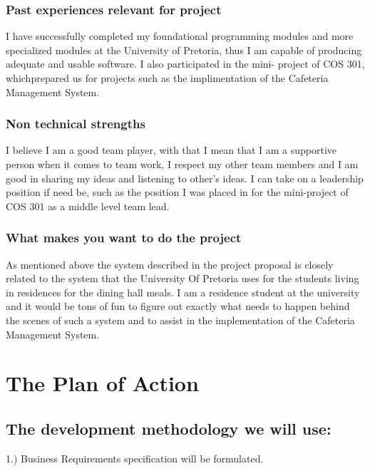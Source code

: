 \documentclass[hidelinks, 12pt, oneside]{article}
\begin{document}
\subsubsection{Past experiences relevant for project}
I have successfully completed my foundational programming modules and
more specialized modules at the University of Pretoria, thus I am capable
of producing adequate and usable software. I also participated in the mini-
project of COS 301, whichprepared us for projects such as the implimentation of 
the Cafeteria Management System. 

\subsubsection{Non technical strengths}
I believe I am a good team player, with that I mean that I am a supportive
person when it comes to team work, I respect my other team members and
I am good in sharing my ideas and listening to other's ideas. I can take on
a leadership position if need be, such as the position I was placed in for the
mini-project of COS 301 as a middle level team lead.

\subsubsection{What makes you want to do the project}
As  mentioned above the system described in the project proposal is closely related to the system that the University Of Pretoria uses for the students living in residences for the dining hall meals. I am a residence student at the university and it would be tons of fun to figure out exactly what needs to happen behind the scenes of such a system and to assist in the implementation of the Cafeteria Management System. 

\section{The Plan of Action}

\subsection{The development methodology we will use:}

1.) Business Requirements specification will be formulated.
\end{document}
